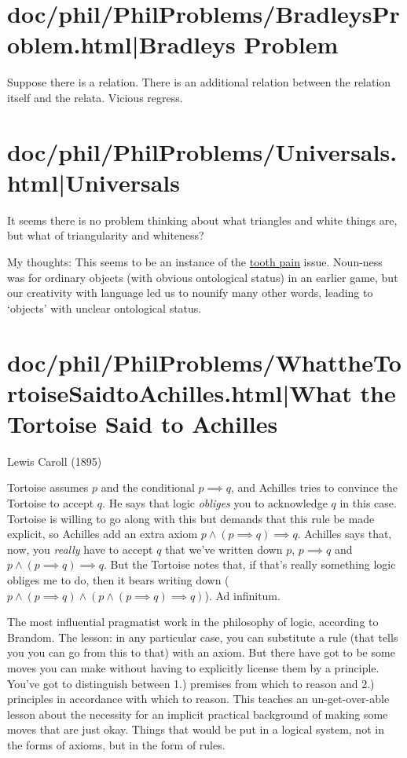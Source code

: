 \documentclass[12pt,a4paper]{report}
\begin{document}
\chapter{doc/phil/PhilProblems/BradleysProblem.html|Bradleys Problem}
Suppose there is a relation. There is an additional relation between the relation itself and the relata. Vicious regress.

\chapter{doc/phil/PhilProblems/Universals.html|Universals}
It seems there is no problem thinking about what triangles and white things are, but what of triangularity and whiteness?

My thoughts: This seems to be an instance of the \href{doc/phil/PhilSituations/ToothPain}{tooth pain} issue. Noun-ness was for ordinary objects (with obvious ontological status) in an earlier game, but our creativity with language led us to nounify many other words, leading to `objects' with unclear ontological status.
\chapter{doc/phil/PhilProblems/WhattheTortoiseSaidtoAchilles.html|What the Tortoise Said to Achilles}

Lewis Caroll (1895)

Tortoise assumes $p$ and the conditional $p \implies q$, and Achilles tries to convince the Tortoise to accept $q$. He says that logic \emph{obliges} you to acknowledge $q$ in this case. Tortoise is willing to go along with this but demands that this rule be made explicit, so Achilles add an extra axiom $p \land (p \implies q) \implies q$. Achilles says that, now, you \emph{really} have to accept $q$ that we've written down $p$, $p \implies q$ and $p \land (p \implies q) \implies q$. But the Tortoise notes that, if that's really something logic obliges me to do, then it bears writing down ($p \land (p \implies q) \land (p \land (p \implies q) \implies q)$). Ad infinitum.

The most influential pragmatist work in the philosophy of logic, according to Brandom. The lesson: in any particular case, you can substitute a rule (that tells you you can go from this to that) with an axiom. But there have got to be some moves you can make without having to explicitly license them by a principle.  You've got to distinguish between 1.) premises from which to reason and 2.) principles in accordance with which to reason. This teaches an un-get-over-able lesson about the necessity for an implicit practical background of making some moves that are just okay. Things that would be put in a logical system, not in the forms of axioms, but in the form of rules.
\end{document}

